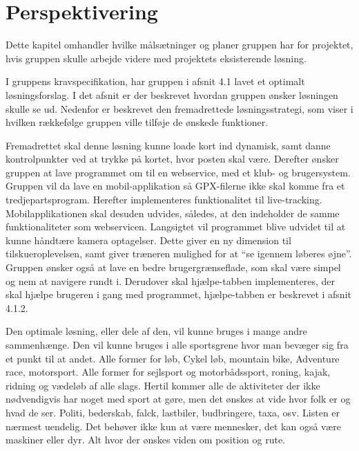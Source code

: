 \chapter{Perspektivering}
Dette kapitel omhandler hvilke målsætninger og planer gruppen har for projektet, hvis gruppen skulle arbejde videre med projektets eksisterende løsning.

I gruppens kravspecifikation, har gruppen i afsnit 4.1 lavet et optimalt løsningsforslag. I det afsnit er der beskrevet hvordan gruppen ønsker løsningen skulle se ud. Nedenfor er beskrevet den fremadrettede løsningsstrategi, som viser i hvilken rækkefølge gruppen ville tilføje de ønskede funktioner.

Fremadrettet skal denne løsning kunne loade kort ind dynamisk, samt danne kontrolpunkter ved at trykke på kortet, hvor posten skal være. Derefter ønsker gruppen at lave programmet om til en webservice, med et klub- og brugersystem. \newline
Gruppen vil da lave en mobil-applikation så GPX-filerne ikke skal komme fra et tredjepartsprogram. Herefter implementeres funktionalitet til live-tracking.  Mobilapplikationen skal desuden udvides, således, at den indeholder de samme funktionaliteter som webservicen. Langsigtet vil programmet blive udvidet til at kunne håndtære kamera optagelser. Dette giver en ny dimension til tilskueroplevelsen, samt giver træneren mulighed for at “se igennem løberes øjne”. \newline
Gruppen ønsker også at lave en bedre brugergrænseflade, som skal være simpel og nem at navigere rundt i. Derudover skal hjælpe-tabben implementeres, der skal hjælpe brugeren i gang med programmet, hjælpe-tabben er beskrevet i afsnit 4.1.2. 

Den optimale løsning, eller dele af den, vil kunne bruges i mange andre sammenhænge. Den vil kunne bruges i alle sportsgrene hvor man bevæger sig fra et punkt til at andet. Alle former for løb, Cykel løb, mountain bike, Adventure race, motorsport. Alle former for sejlsport og motorbådssport, roning, kajak, ridning og vædeløb af alle slags. Hertil kommer alle de aktiviteter der ikke nødvendigvis har noget med sport at gøre, men det ønskes at vide hvor folk er og hvad de ser. Politi, bederskab, falck, lastbiler, budbringere, taxa, osv. Listen er nærmest uendelig. Det behøver ikke kun at være mennesker, det kan også være maskiner eller dyr. Alt hvor der ønskes viden om position og rute.
